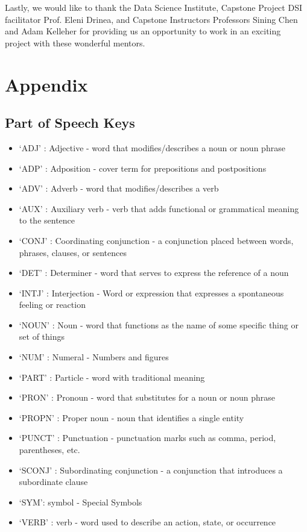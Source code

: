 \documentclass[11pt]{article}
\begin{document}
Lastly, we would like to thank the Data Science Institute, Capstone Project DSI facilitator Prof. Eleni Drinea, and Capstone Instructors Professors Sining Chen and Adam Kelleher for providing us an opportunity to work in an exciting project with these wonderful mentors. 

 


\newpage


\section*{Appendix}

\subsection* {Part of Speech Keys}

\begin{itemize}
\setlength\itemsep{-0.25em}
\item`ADJ' : Adjective -  word that modifies/describes a noun or noun phrase
\item `ADP' : Adposition - cover term for prepositions and postpositions
\item `ADV' : Adverb - word that modifies/describes a verb
\item`AUX' : Auxiliary verb -  verb that adds functional or grammatical meaning to the sentence
\item `CONJ' : Coordinating conjunction - a conjunction placed between words, phrases, clauses, or sentences
\item `DET' : Determiner - word that serves to express the reference of a noun
\item `INTJ' : Interjection - Word or expression that expresses a spontaneous feeling or reaction
\item `NOUN' : Noun -  word that functions as the name of some specific thing or set of things
\item `NUM' : Numeral - Numbers and figures 
\item `PART' : Particle - word with traditional meaning
\item `PRON' : Pronoun -  word that substitutes for a noun or noun phrase
\item `PROPN' : Proper noun -  noun that identifies a single entity 
\item `PUNCT' : Punctuation - punctuation marks such as comma, period, parentheses, etc. 
\item `SCONJ' : Subordinating conjunction - a conjunction that introduces a subordinate clause
\item `SYM': symbol - Special Symbols
\item `VERB' : verb - word used to describe an action, state, or occurrence
\end{itemize}
\end{document}
